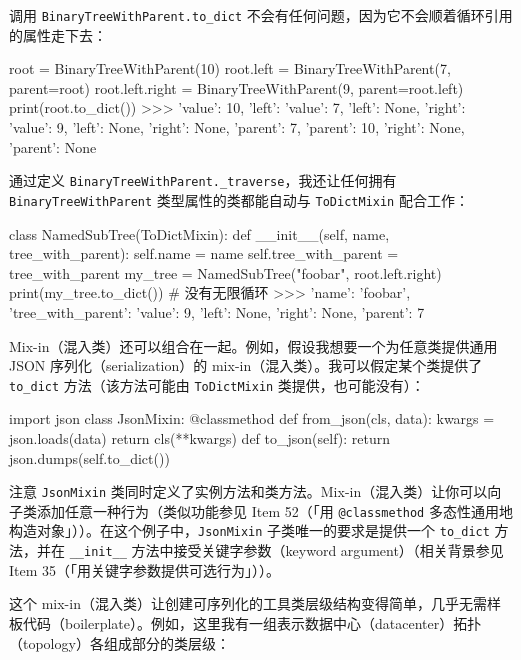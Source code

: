 调用 \texttt{BinaryTreeWithParent.to\_dict} 不会有任何问题，因为它不会顺着循环引用的属性走下去：

\begin{codebox}[python]
root = BinaryTreeWithParent(10)
root.left = BinaryTreeWithParent(7, parent=root)
root.left.right = BinaryTreeWithParent(9, parent=root.left)
print(root.to_dict())
>>>
{'value': 10,
 'left': {'value': 7,
          'left': None,
          'right': {'value': 9,
                    'left': None,
                    'right': None,
                    'parent': 7},
          'parent': 10},
 'right': None,
 'parent': None}
\end{codebox}

通过定义 \texttt{BinaryTreeWithParent.\_traverse}，我还让任何拥有 \texttt{BinaryTreeWithParent} 类型属性的类都能自动与 \texttt{ToDictMixin} 配合工作：

\begin{codebox}[python]
class NamedSubTree(ToDictMixin):
    def __init__(self, name, tree_with_parent):
        self.name = name
        self.tree_with_parent = tree_with_parent
my_tree = NamedSubTree("foobar", root.left.right)
print(my_tree.to_dict())  # 没有无限循环
>>>
{'name': 'foobar',
 'tree_with_parent': {'value': 9,
                      'left': None,
                      'right': None,
                      'parent': 7}}
\end{codebox}

Mix-in（混入类）还可以组合在一起。例如，假设我想要一个为任意类提供通用 JSON 序列化（serialization）的 mix-in（混入类）。我可以假定某个类提供了 \texttt{to\_dict} 方法（该方法可能由 \texttt{ToDictMixin} 类提供，也可能没有）：

\begin{codebox}[python]
import json
class JsonMixin:
    @classmethod
    def from_json(cls, data):
        kwargs = json.loads(data)
        return cls(**kwargs)
    def to_json(self):
        return json.dumps(self.to_dict())
\end{codebox}

注意 \texttt{JsonMixin} 类同时定义了实例方法和类方法。Mix-in（混入类）让你可以向子类添加任意一种行为（类似功能参见 Item 52（「用 \texttt{@classmethod} 多态性通用地构造对象」））。在这个例子中，\texttt{JsonMixin} 子类唯一的要求是提供一个 \texttt{to\_dict} 方法，并在 \texttt{\_\_init\_\_} 方法中接受关键字参数（keyword argument）（相关背景参见 Item 35（「用关键字参数提供可选行为」））。

这个 mix-in（混入类）让创建可序列化的工具类层级结构变得简单，几乎无需样板代码（boilerplate）。例如，这里我有一组表示数据中心（datacenter）拓扑（topology）各组成部分的类层级：


